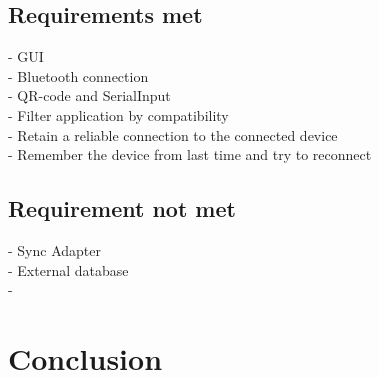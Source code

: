 		\subsection{Requirements met}
			- GUI\\
			- Bluetooth connection\\
			- QR-code and SerialInput\\
			- Filter application by compatibility\\
			- Retain a reliable connection to the connected device\\
			- Remember the device from last time and try to reconnect\\

		\subsection{Requirement not met}
			- Sync Adapter\\
			- External database\\
			- 

	\section{Conclusion}